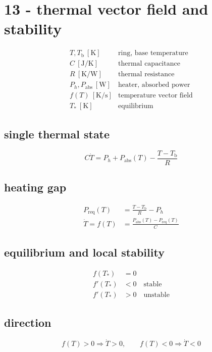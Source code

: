 \section*{13 - thermal vector field and stability}

\[
\begin{array}{ll}T,T_{\mathrm b}\ [\mathrm K]&\text{ring, base temperature}\\[0.6em]C\ [\mathrm{J/K}]&\text{thermal capacitance}\\[0.6em]R\ [\mathrm{K/W}]&\text{thermal resistance}\\[0.6em]P_h,P_{\mathrm{abs}}\ [\mathrm W]&\text{heater, absorbed power}\\[0.6em]f(T)\ [\mathrm{K/s}]&\text{temperature vector field}\\[0.6em]T_*\ [\mathrm K]&\text{equilibrium}\end{array}
\]

\subsection*{single thermal state}
\[
\displaystyle C\dot T=P_h+P_{\mathrm{abs}}(T)-\frac{T-T_{\mathrm b}}R
\]

\subsection*{heating gap}
\[
\displaystyle \begin{aligned}P_{\mathrm{req}}(T)&=\frac{T-T_{\mathrm b}}R-P_h\\\dot T=f(T)&=\frac{P_{\mathrm{abs}}(T)-P_{\mathrm{req}}(T)}C\end{aligned}
\]

\subsection*{equilibrium and local stability}
\[
\displaystyle \begin{aligned}f(T_*)&=0\\f'(T_*)&<0\quad\text{stable}\\f'(T_*)&>0\quad\text{unstable}\end{aligned}
\]

\subsection*{direction}
\[
\displaystyle f(T)>0\Rightarrow\dot T>0,\qquad f(T)<0\Rightarrow\dot T<0
\]

